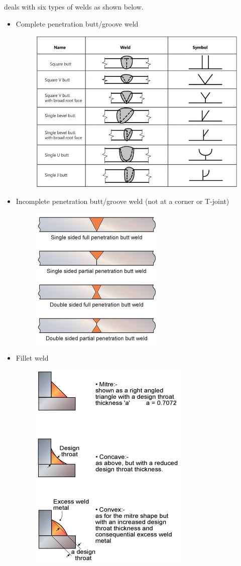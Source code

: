 \NZSSTEEL{} deals with six types of welds as shown below.
\begin{itemize}
\item Complete penetration butt/groove weld
\begin{figure}[H]
\centering
\includegraphics[scale=.6]{PIC/CH07/WE}
\end{figure}
\item Incomplete penetration butt/groove weld (not at a corner or T-joint)
\begin{figure}[H]
\centering
\includegraphics[scale=.6]{PIC/CH07/PW}
\end{figure}
\item Fillet weld
\begin{figure}[H]
\centering
\includegraphics[scale=.6]{PIC/CH07/FW3}

\end{figure}
\end{itemize}
